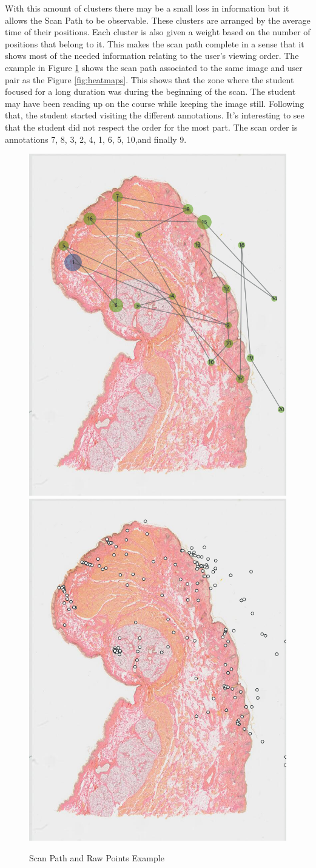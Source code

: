 \documentclass[a4paper,11pt]{report}
\numberwithin{figure}{chapter} %
\begin{document}
\begin{itemize}
        With this amount of clusters there may be a small loss in information but it allows the Scan Path to be observable.
        These clusters are arranged by the average time of their positions.
        Each cluster is also given a weight based on the number of positions that belong to it.
        This makes the scan path complete in a sense that it shows most of the needed information relating to the user's viewing order.
        The example in Figure \ref{fig:scanpath} shows the scan path associated to the same image and user pair as the Figure \ref{fig:heatmaps}.
        This shows that the zone where the student focused for a long duration was during the beginning of the scan.
        The student may have been reading up on the course while keeping the image still.
        Following that, the student started visiting the different annotations.
        It's interesting to see that the student did not respect the order for the most part.
        The scan order is annotations 7, 8, 3, 2, 4, 1, 6, 5, 10,and finally 9.
          \begin{figure}[H]
          \centering
          \includegraphics[width=.3\linewidth]{images/5501147_scanpath.png} \includegraphics[width=.3\linewidth]{images/5501147_points.png}
          \caption{Scan Path and Raw Points Example}
          \label{fig:scanpath}
    \end{figure}
    \end{itemize}
\end{document}
